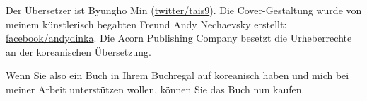\iffalse
\begin{figure}[H]
\centering
\texttt{[image: acorn\_cover.jpg]}
\end{figure}
\fi

Der Übersetzer ist Byungho Min (\href{http://go.yurichev.com/17344}{twitter/tais9}).
Die Cover-Gestaltung wurde von meinem künstlerisch begabten Freund Andy Nechaevsky erstellt:
\href{http://go.yurichev.com/17023}{facebook/andydinka}.
Die Acorn Publishing Company besetzt die Urheberrechte an der koreanischen Übersetzung.

Wenn Sie also ein  Buch in Ihrem Buchregal auf koreanisch haben und 
mich bei meiner Arbeit unterstützen wollen, können Sie das Buch nun kaufen.


